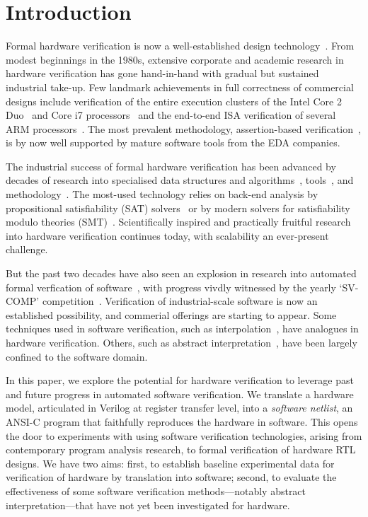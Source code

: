 \section{Introduction}\label{sec:intro}
%
Formal hardware verification is now a well-established design technology~\cite{Seligman:2015:FV}. From modest beginnings in the 1980s, extensive corporate and academic research in hardware verification has gone hand-in-hand with gradual but sustained industrial take-up.  Few landmark achievements in full correctness of commercial designs include verification of the entire execution clusters of the Intel Core 2 Duo~\cite{Core2}  and Core i7 processors~\cite{i7} and the end-to-end ISA verification of several ARM processors~\cite{ARM}. The most prevalent methodology, assertion-based verification~\cite{Foster:2009:AAB}, is by now well supported by mature software tools from the EDA companies.

The industrial success of formal hardware verification has been advanced by decades of research into specialised data structures and algorithms~\cite{ic3,fmcad2000,ken,biere,STE}, tools~\cite{Seger:2005:IEE,abc,ebmc,vis,cadence,synopsysfv}, and methodology~\cite{MCMILLAN2000279,Aagaard:2000:MLH,uclid,word-term,word-bmc,DBLP:conf/lpar/AndrausLS08}.  The most-used technology relies on back-end analysis by propositional satisfiability (SAT) solvers~\cite{Biere1999} or by modern solvers for satisfiability modulo theories (SMT)~\cite{decision_procedures, DBLP:conf/lpar/AndrausLS08,soc-keating,
DBLP:conf/mtv/SunkariCVM07,DBLP:conf/cav/Bjesse08}. Scientifically inspired and practically fruitful research into hardware verification continues today, with scalability an ever-present challenge.

But the past two decades have also seen an explosion in research into automated formal verfication of software~\cite{dkw2008}, with progress vivdly witnessed by the yearly `SV-COMP' competition~\cite{Beyer2017}.  Verification of industrial-scale software is now an established possibility, and commerial offerings are starting to appear. Some techniques used in software verification, such as interpolation~\cite{Interpolants,Kroening:2011:ISV}, have analogues in hardware verification. Others, such as abstract interpretation~\cite{CousotCousot77,Cousot:1996:AI}, have been largely confined to the software domain.  

In this paper, we explore the potential for hardware verification to leverage past and future progress in automated software verification. We translate a hardware model, articulated in Verilog at register transfer level, into a \emph{software netlist}, an ANSI-C program that faithfully reproduces the hardware in software. This opens the door to experiments with using software verification technologies, arising from contemporary program analysis research, to formal verification of hardware RTL designs. We have two aims: first, to establish baseline experimental data for verification of hardware by translation into software; second, to evaluate the effectiveness of some software verification methods---notably abstract interpretation---that have not yet been investigated for hardware.  

